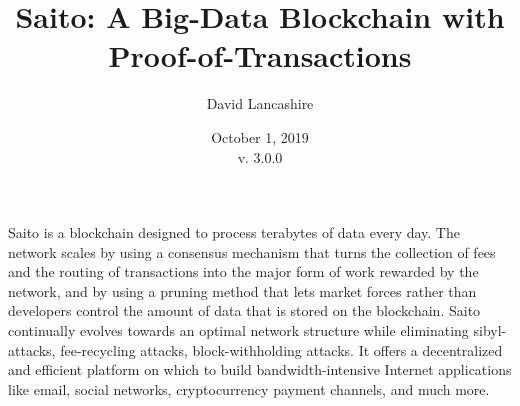 \documentclass[11.5pt, oneside]{article}   	%
\title{Saito: A Big-Data Blockchain with Proof-of-Transactions}
\author{David Lancashire}
\date{October 1, 2019\\v. 3.0.0}
\begin{document}
\maketitle



\begin{onecolabstract}
Saito is a blockchain designed to process terabytes of data every day. The network scales by using a consensus mechanism that turns the collection of fees and the routing of transactions into the major form of work rewarded by the network, and by using a pruning method that lets market forces rather than developers control the amount of data that is stored on the blockchain. Saito continually evolves towards an optimal network structure while eliminating sibyl-attacks, fee-recycling attacks, block-withholding attacks. It offers a decentralized and efficient platform on which to build bandwidth-intensive Internet applications like email, social networks, cryptocurrency payment channels, and much more.
\end{onecolabstract}
\end{document}
